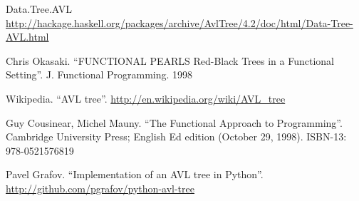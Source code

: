 \documentclass[b5paper]{ctexart}
\begin{document}
\ifx\wholebook\relax \else
\begin{thebibliography}{99}

Data.Tree.AVL \url{http://hackage.haskell.org/packages/archive/AvlTree/4.2/doc/html/Data-Tree-AVL.html}

Chris Okasaki. ``FUNCTIONAL PEARLS Red-Black Trees in a Functional Setting''. J. Functional Programming. 1998

Wikipedia. ``AVL tree''. \url{http://en.wikipedia.org/wiki/AVL_tree}

Guy Cousinear, Michel Mauny. ``The Functional Approach to Programming''. Cambridge University Press; English Ed edition (October 29, 1998). ISBN-13: 978-0521576819

Pavel Grafov. ``Implementation of an AVL tree in Python''. \url{http://github.com/pgrafov/python-avl-tree}
\end{thebibliography}
\end{document}
